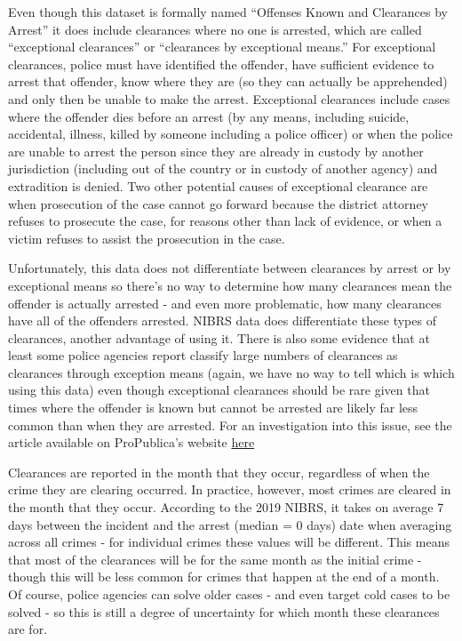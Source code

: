 \documentclass[
  12pt,
  openany]{book}
\begin{document}
Even though this dataset is formally named ``Offenses Known and Clearances by Arrest'' it does include clearances where no one is arrested, which are called ``exceptional clearances'' or ``clearances by exceptional means.'' For exceptional clearances, police must have identified the offender, have sufficient evidence to arrest that offender, know where they are (so they can actually be apprehended) and only then be unable to make the arrest. Exceptional clearances include cases where the offender dies before an arrest (by any means, including suicide, accidental, illness, killed by someone including a police officer) or when the police are unable to arrest the person since they are already in custody by another jurisdiction (including out of the country or in custody of another agency) and extradition is denied. Two other potential causes of exceptional clearance are when prosecution of the case cannot go forward because the district attorney refuses to prosecute the case, for reasons other than lack of evidence, or when a victim refuses to assist the prosecution in the case.

Unfortunately, this data does not differentiate between clearances by arrest or by exceptional means so there's no way to determine how many clearances mean the offender is actually arrested - and even more problematic, how many clearances have all of the offenders arrested. NIBRS data does differentiate these types of clearances, another advantage of using it. There is also some evidence that at least some police agencies report classify large numbers of clearances as clearances through exception means (again, we have no way to tell which is which using this data) even though exceptional clearances should be rare given that times where the offender is known but cannot be arrested are likely far less common than when they are arrested. For an investigation into this issue, see the \citet{yeung2018comes} article available on ProPublica's website \href{https://www.propublica.org/article/when-it-comes-to-rape-just-because-a-case-is-cleared-does-not-mean-solved}{here}

Clearances are reported in the month that they occur, regardless of when the crime they are clearing occurred. In practice, however, most crimes are cleared in the month that they occur. According to the 2019 NIBRS, it takes on average 7 days between the incident and the arrest (median = 0 days) date when averaging across all crimes - for individual crimes these values will be different. This means that most of the clearances will be for the same month as the initial crime - though this will be less common for crimes that happen at the end of a month. Of course, police agencies can solve older cases - and even target cold cases to be solved - so this is still a degree of uncertainty for which month these clearances are for.
\end{document}
